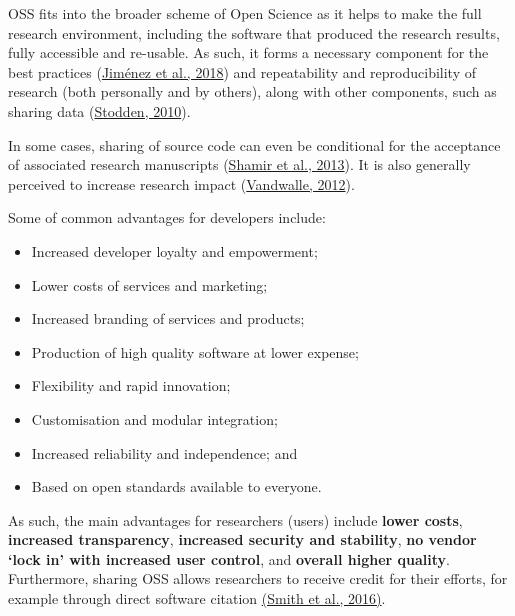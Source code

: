 \documentclass[]{book}
\begin{document}
OSS fits into the broader scheme of Open Science as it helps to make the full research environment, including the software that produced the research results, fully accessible and re-usable. As such, it forms a necessary component for the best practices (\href{https://github.com/OpenScienceMOOC/Module-5-Open-Research-Software-and-Open-Source/blob/master/Reading\%20Material_Open\%20Source\%20and\%20Open\%20Research\%20Software/Jim\%C3\%A9nez\%20et\%20al.\%2C\%202018.pdf}{Jiménez et al., 2018}) and repeatability and reproducibility of research (both personally and by others), along with other components, such as sharing data (\href{https://github.com/OpenScienceMOOC/Module-5-Open-Research-Software-and-Open-Source/blob/master/Reading\%20Material_Open\%20Source\%20and\%20Open\%20Research\%20Software/Stodden\%2C\%202010.pdf}{Stodden, 2010}).

In some cases, sharing of source code can even be conditional for the acceptance of associated research manuscripts (\href{https://github.com/OpenScienceMOOC/Module-5-Open-Research-Software-and-Open-Source/blob/master/Reading\%20Material_Open\%20Source\%20and\%20Open\%20Research\%20Software/Shamir\%20et\%20al.\%2C\%202013.pdf}{Shamir et al., 2013}). It is also generally perceived to increase research impact (\href{https://github.com/OpenScienceMOOC/Module-5-Open-Research-Software-and-Open-Source/blob/master/Reading\%20Material_Open\%20Source\%20and\%20Open\%20Research\%20Software/Vandewalle\%2C\%202012.pdf}{Vandwalle, 2012}).

Some of common advantages for developers include:

\begin{itemize}
\item
  Increased developer loyalty and empowerment;
\item
  Lower costs of services and marketing;
\item
  Increased branding of services and products;
\item
  Production of high quality software at lower expense;
\item
  Flexibility and rapid innovation;
\item
  Customisation and modular integration;
\item
  Increased reliability and independence; and
\item
  Based on open standards available to everyone.
\end{itemize}

As such, the main advantages for researchers (users) include \textbf{lower costs}, \textbf{increased transparency}, \textbf{increased security and stability}, \textbf{no vendor `lock in' with increased user control}, and \textbf{overall higher quality}. Furthermore, sharing OSS allows researchers to receive credit for their efforts, for example through direct software citation \href{https://github.com/OpenScienceMOOC/Module-5-Open-Research-Software-and-Open-Source/blob/master/Reading\%20Material_Open\%20Source\%20and\%20Open\%20Research\%20Software/Smith\%20et\%20al.\%2C\%202016.pdf}{(Smith et al., 2016)}.
\end{document}
